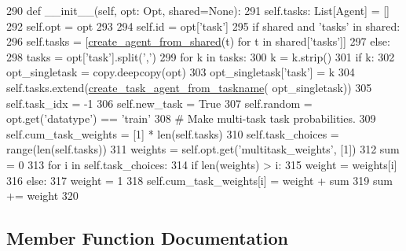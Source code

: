 \begin{DoxyCode}
290     \textcolor{keyword}{def }\_\_init\_\_(self, opt: Opt, shared=\textcolor{keywordtype}{None}):
291         self.tasks: List[Agent] = []
292         self.opt = opt
293 
294         self.id = opt[\textcolor{stringliteral}{'task'}]
295         \textcolor{keywordflow}{if} shared \textcolor{keywordflow}{and} \textcolor{stringliteral}{'tasks'} \textcolor{keywordflow}{in} shared:
296             self.tasks = [\hyperlink{namespaceparlai_1_1core_1_1agents_aa5af5dd1d2f9da491b60348d479b849f}{create\_agent\_from\_shared}(t) \textcolor{keywordflow}{for} t \textcolor{keywordflow}{in} shared[\textcolor{stringliteral}{'tasks'}]]
297         \textcolor{keywordflow}{else}:
298             tasks = opt[\textcolor{stringliteral}{'task'}].split(\textcolor{stringliteral}{','})
299             \textcolor{keywordflow}{for} k \textcolor{keywordflow}{in} tasks:
300                 k = k.strip()
301                 \textcolor{keywordflow}{if} k:
302                     opt\_singletask = copy.deepcopy(opt)
303                     opt\_singletask[\textcolor{stringliteral}{'task'}] = k
304                     self.tasks.extend(\hyperlink{namespaceparlai_1_1core_1_1agents_a76269fb567532a8fb7f29edcc20a6e47}{create\_task\_agent\_from\_taskname}(
      opt\_singletask))
305         self.task\_idx = -1
306         self.new\_task = \textcolor{keyword}{True}
307         self.random = opt.get(\textcolor{stringliteral}{'datatype'}) == \textcolor{stringliteral}{'train'}
308         \textcolor{comment}{# Make multi-task task probabilities.}
309         self.cum\_task\_weights = [1] * len(self.tasks)
310         self.task\_choices = range(len(self.tasks))
311         weights = self.opt.get(\textcolor{stringliteral}{'multitask\_weights'}, [1])
312         sum = 0
313         \textcolor{keywordflow}{for} i \textcolor{keywordflow}{in} self.task\_choices:
314             \textcolor{keywordflow}{if} len(weights) > i:
315                 weight = weights[i]
316             \textcolor{keywordflow}{else}:
317                 weight = 1
318             self.cum\_task\_weights[i] = weight + sum
319             sum += weight
320 
\end{DoxyCode}


\subsection{Member Function Documentation}
\mbox{\label{classparlai_1_1core_1_1agents_1_1MultiTaskTeacher_a29a2c8f7679aafd2d67b4b0db54d58a3}} 
